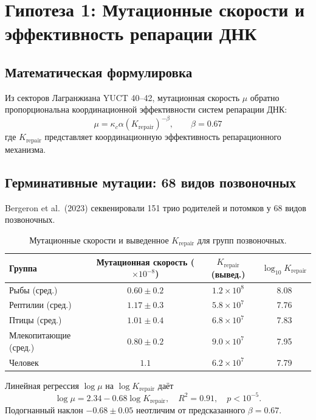 \documentclass[11pt,a4paper]{article}
\begin{document}
	\section{Гипотеза 1: Мутационные скорости и эффективность репарации ДНК}
	
	\subsection{Математическая формулировка}
	
	Из секторов Лагранжиана YUCT 40--42, мутационная скорость \(\mu\) обратно пропорциональна координационной эффективности систем репарации ДНК:
	\begin{equation}
		\mu = \kappa_c \alpha \left(K_{\text{repair}}\right)^{-\beta}, \qquad \beta = 0.67
		\label{eq:mutation-rate}
	\end{equation}
	где \(K_{\text{repair}}\) представляет координационную эффективность репарационного механизма.
	
	\subsection{Герминативные мутации: 68 видов позвоночных}
	
	Bergeron et al.\ (2023) секвенировали 151 трио родителей и потомков у 68 видов позвоночных.
	
	\begin{table}[H]
		\centering
		\caption{Мутационные скорости и выведенное \(K_{\text{repair}}\) для групп позвоночных.}
		\label{tab:vertebrate-mutations}
		\begin{tabular}{lccc}
			\toprule
			\textbf{Группа} & \textbf{Мутационная скорость (\(\times 10^{-8}\))} & \textbf{\(K_{\text{repair}}\) (вывед.)} & \(\log_{10} K_{\text{repair}}\) \\
			\midrule
			Рыбы (сред.) & \(0.60 \pm 0.2\) & \(1.2 \times 10^8\) & 8.08 \\
			Рептилии (сред.) & \(1.17 \pm 0.3\) & \(5.8 \times 10^7\) & 7.76 \\
			Птицы (сред.) & \(1.01 \pm 0.4\) & \(6.8 \times 10^7\) & 7.83 \\
			Млекопитающие (сред.) & \(0.80 \pm 0.2\) & \(9.0 \times 10^7\) & 7.95 \\
			Человек & \(1.1\) & \(6.2 \times 10^7\) & 7.79 \\
			\bottomrule
		\end{tabular}
	\end{table}
	
	Линейная регрессия \(\log \mu\) на \(\log K_{\text{repair}}\) даёт
	\begin{equation}
		\log \mu = 2.34 - 0.68 \log K_{\text{repair}}, \quad R^2 = 0.91, \quad p < 10^{-5}.
		\label{eq:mutation-fit}
	\end{equation}
	Подогнанный наклон \(-0.68 \pm 0.05\) неотличим от предсказанного \(\beta = 0.67\).
	
\end{document}
